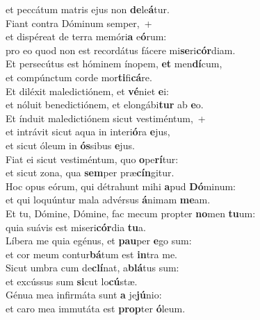 \oddverse et peccátum matris ejus non \textbf{de}le\textbf{á}tur.\\
\evenverse Fiant contra Dóminum semper,~+\\
\evenverse  et dispéreat de terra memóri\textbf{a} e\textbf{ó}rum:~\*\\
\evenverse pro eo quod non est recordátus fácere mi\textbf{se}ri\textbf{cór}diam.\\
\oddverse Et persecútus est hóminem ínopem, \textbf{et} men\textbf{dí}cum,~\*\\
\oddverse et compúnctum corde mor\textbf{ti}fi\textbf{cá}re.\\
\evenverse Et diléxit maledictiónem, et \textbf{vé}niet \textbf{e}i:~\*\\
\evenverse et nóluit benedictiónem, et elongábi\textbf{tur} ab \textbf{e}o.\\
\oddverse Et índuit maledictiónem sicut vestiméntum,~+\\
\oddverse  et intrávit sicut aqua in interi\textbf{ó}ra \textbf{e}jus,~\*\\
\oddverse et sicut óleum in \textbf{ós}sibus \textbf{e}jus.\\
\evenverse Fiat ei sicut vestiméntum, quo \textbf{o}pe\textbf{rí}tur:~\*\\
\evenverse et sicut zona, qua \textbf{sem}per præ\textbf{cín}gitur.\\
\oddverse Hoc opus eórum, qui détrahunt mihi \textbf{a}pud \textbf{Dó}minum:~\*\\
\oddverse et qui loquúntur mala advérsus \textbf{á}nimam \textbf{me}am.\\
\evenverse Et tu, Dómine, Dómine, fac mecum propter \textbf{no}men \textbf{tu}um:~\*\\
\evenverse quia suávis est miseri\textbf{cór}dia \textbf{tu}a.\\
\oddverse Líbera me quia egénus, et \textbf{pau}per \textbf{e}go sum:~\*\\
\oddverse et cor meum contur\textbf{bá}tum est \textbf{in}tra me.\\
\evenverse Sicut umbra cum de\textbf{clí}nat, a\textbf{blá}tus sum:~\*\\
\evenverse et excússus sum \textbf{si}cut lo\textbf{cú}stæ.\\
\oddverse Génua mea infirmáta sunt \textbf{a} je\textbf{jú}nio:~\*\\
\oddverse et caro mea immutáta est \textbf{prop}ter \textbf{ó}leum.\\
